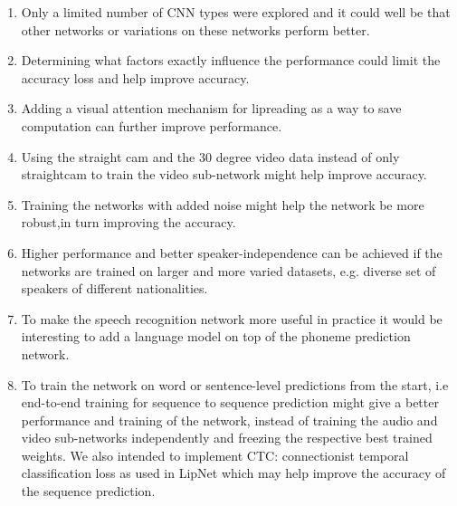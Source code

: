 \documentclass{article}
\begin{document}
\begin{enumerate}
    \item Only a limited number of CNN types were explored and it could well be that other networks or variations on these networks perform better.
    \item Determining what factors exactly influence the performance could limit the accuracy loss and help improve accuracy.
    \item Adding a visual attention mechanism for lipreading as a way to save computation can further improve performance.
    \item Using the straight cam and the 30 degree video data instead of only straightcam to train the video sub-network might help improve accuracy.
    \item Training the networks with added noise might help the network be more robust,in turn improving the accuracy.
    \item Higher performance and better speaker-independence can be achieved if the networks are trained on larger and more varied datasets, e.g. diverse set of speakers of different nationalities.
    \item To make the speech recognition network more useful in practice it would be interesting to add a language model on top of the phoneme prediction network.
    \item To train the network on word or sentence-level predictions from the start, i.e end-to-end training for sequence to sequence\cite{sq2sq} prediction might give a better performance and training of the network, instead of training the audio and video sub-networks independently and freezing the respective best trained weights. We also intended to implement CTC: connectionist temporal classification loss as used in LipNet \cite{LIPNET} which may help improve the accuracy of the sequence prediction. 
\end{enumerate}



\end{document}
